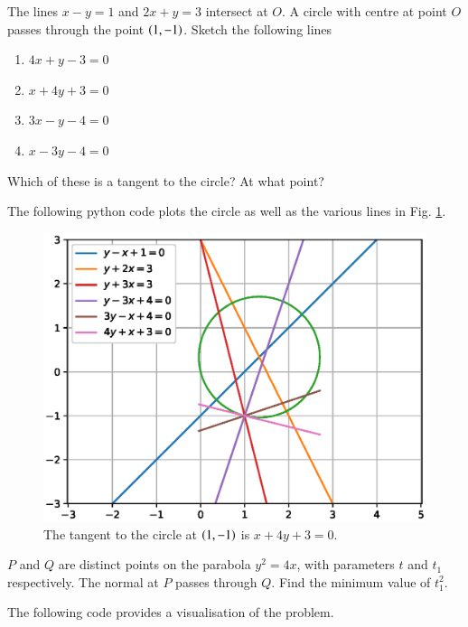 \documentclass[journal,12pt,twocolumn]{IEEEtran}
\begin{document}
%
\begin{problem}
The lines $x-y=1$ and $2x+y=3$ intersect at $O$.  A circle with centre at point $O$ passes through the point $\left(1,-1\right)$. Sketch the following lines
\begin{enumerate}
\item $4x +y -3 = 0$
\item $x + 4y+3 = 0$
\item $3x - y  - 4 = 0$
\item $x - 3y - 4 = 0$
\end{enumerate}
Which of these is a tangent to the circle? At what point?
\end{problem}
\solution

%
The following python code plots the circle as well as the various lines  in Fig. \ref{fig_22}.

%
\begin{figure}[h]
\centering
\includegraphics[width=\columnwidth]{./figs/ee16b1022}
\caption{ The tangent to the circle at $\left(1,-1\right)$ is $x+4y+3=0$. }
\label{fig_22}	
\end{figure}
%
\begin{problem}
$P$ and $Q$ are distinct points on the parabola $y^2 = 4x$, with parameters $t$ and $t_1$ respectively. The normal at $P$ passes through $Q$.  Find the minimum value of $t_1^2$.
\end{problem}
\solution

The following code provides a visualisation of the problem.

%
\end{document}

